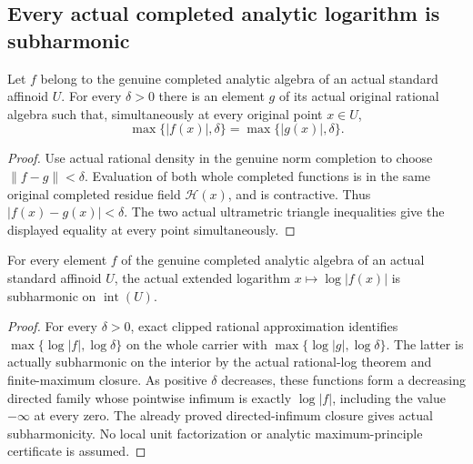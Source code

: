 \subsection{Every actual completed analytic logarithm is subharmonic}\label{subsec:fc-line-analytic-log-subharmonic}

\begin{lemma}\label{lem:fc-analytic-clipped-rational-approximation}
\leanok
{}
Let $f$ belong to the genuine completed analytic algebra of an actual
standard affinoid $U$. For every $\delta>0$ there is an element $g$ of its
actual original rational algebra such that, simultaneously at every
original point $x\in U$,
\[
  \max\{|f(x)|,\delta\}=\max\{|g(x)|,\delta\}.
\]
\end{lemma}

\begin{proof}
Use actual rational density in the genuine norm completion to choose
$\|f-g\|<\delta$. Evaluation of both whole completed functions is in the
same original completed residue field $\mathcal H(x)$, and is contractive.
Thus $|f(x)-g(x)|<\delta$. The two actual ultrametric triangle inequalities
give the displayed equality at every point simultaneously.
\end{proof}

\begin{theorem}\label{thm:fc-completed-analytic-log-subharmonic}
\leanok
{}
For every element $f$ of the genuine completed analytic algebra of an
actual standard affinoid $U$, the actual extended logarithm
$x\mapsto\log|f(x)|$ is subharmonic on $\operatorname{int}(U)$.
\end{theorem}

\begin{proof}
For every $\delta>0$, exact clipped rational approximation identifies
$\max\{\log|f|,\log\delta\}$ on the whole carrier with
$\max\{\log|g|,\log\delta\}$. The latter is actually subharmonic on the
interior by the actual rational-log theorem and finite-maximum closure.
As positive $\delta$ decreases, these functions form a decreasing
directed family whose pointwise infimum is exactly $\log|f|$, including
the value $-\infty$ at every zero. The already proved directed-infimum
closure gives actual subharmonicity. No local unit factorization or
analytic maximum-principle certificate is assumed.
\end{proof}
